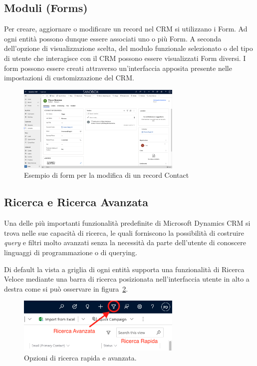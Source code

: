 \subsection{Moduli (Forms)}
Per creare, aggiornare o modificare un record nel CRM si utilizzano i Form. Ad ogni entità possono dunque essere associati uno o più Form. A seconda dell'opzione di visualizzazione scelta, del modulo funzionale selezionato o del tipo di utente che interagisce con il CRM possono essere visualizzati Form diversi. 
I form possono essere creati attraverso un'interfaccia apposita presente nelle impostazioni di customizzazione del CRM.
\begin{figure}[ht!]
  \centering
  \includegraphics[width=0.7\textwidth]{form-example.png}
  \caption{Esempio di form per la modifica di un record Contact}
  \label{fig:formExample}
\end{figure}

\subsection{Ricerca e Ricerca Avanzata}
Una delle più importanti funzionalità predefinite di Microsoft Dynamics CRM si trova nelle sue capacità di ricerca, le quali forniscono la possibilità di costruire \textit{query} e filtri molto avanzati senza la necessità da parte dell'utente di conoscere linguaggi di programmazione o di querying.

Di default la vista a griglia di ogni entità supporta una funzionalità di Ricerca Veloce mediante una barra di ricerca posizionata nell'interfaccia utente in alto a destra come si può osservare in figura~\ref{fig:quickSearch}.
\begin{figure}[ht]
  \centering
  \includegraphics[width=0.7\textwidth]{quick-search.png}
  \caption{Opzioni di ricerca rapida e avanzata.}
  \label{fig:quickSearch}
\end{figure}


